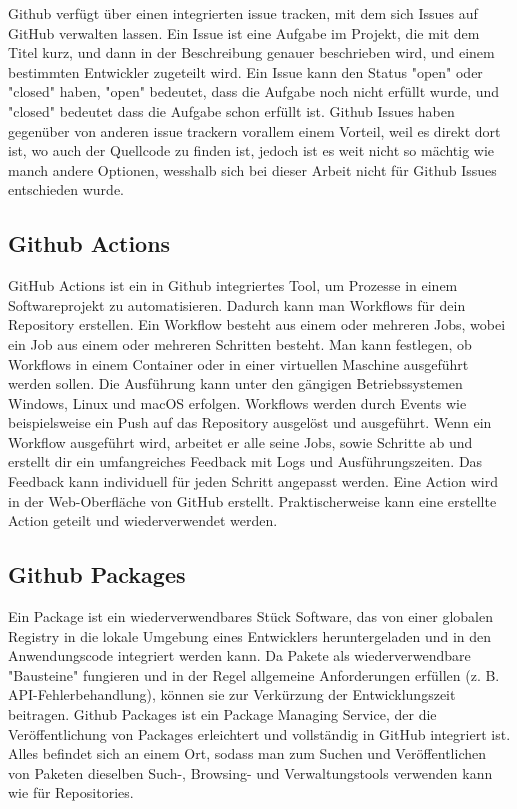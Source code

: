 Github verfügt über einen integrierten issue tracken, mit dem sich Issues auf GitHub verwalten lassen. Ein Issue ist eine 
Aufgabe im Projekt, die mit dem Titel kurz, und dann in der Beschreibung genauer beschrieben wird, und einem bestimmten Entwickler 
zugeteilt wird. Ein Issue kann den Status "open" oder "closed" haben, "open" bedeutet, dass die Aufgabe noch nicht erfüllt wurde, und 
"closed" bedeutet dass die Aufgabe schon erfüllt ist. Github Issues haben gegenüber von anderen issue trackern vorallem einem Vorteil, 
weil es direkt dort ist, wo auch der Quellcode zu finden ist, jedoch ist es weit nicht so mächtig wie manch andere Optionen, wesshalb 
sich bei dieser Arbeit nicht für Github Issues entschieden wurde.
\cite{sysarch-github-3}

\subsection{Github Actions}

GitHub Actions ist ein in Github integriertes Tool, um Prozesse in einem Softwareprojekt zu automatisieren. 
Dadurch kann man Workflows für dein Repository erstellen. Ein Workflow besteht aus einem oder mehreren Jobs, 
wobei ein Job aus einem oder mehreren Schritten besteht. Man kann festlegen, ob Workflows in einem Container oder in einer virtuellen 
Maschine ausgeführt werden sollen. Die Ausführung kann unter den gängigen Betriebssystemen Windows, Linux und macOS erfolgen. 
Workflows werden durch Events wie beispielsweise ein Push auf das Repository ausgelöst und ausgeführt. Wenn ein Workflow ausgeführt wird, 
arbeitet er alle seine Jobs, sowie Schritte ab und erstellt dir ein umfangreiches Feedback mit Logs und Ausführungszeiten. 
Das Feedback kann individuell für jeden Schritt angepasst werden. Eine Action wird in der Web-Oberfläche von GitHub erstellt. 
Praktischerweise kann eine erstellte Action geteilt und wiederverwendet werden.
\cite{sysarch-github-4}

\subsection{Github Packages}

Ein Package ist ein wiederverwendbares Stück Software, das von einer globalen Registry in die lokale Umgebung eines Entwicklers heruntergeladen und 
in den Anwendungscode integriert werden kann. Da Pakete als wiederverwendbare "Bausteine" fungieren und in der Regel allgemeine Anforderungen erfüllen 
(z. B. API-Fehlerbehandlung), können sie zur Verkürzung der Entwicklungszeit beitragen. Github Packages ist ein Package Managing Service, 
der die Veröffentlichung von Packages erleichtert und vollständig in GitHub integriert ist. Alles befindet sich an einem Ort, 
sodass man zum Suchen und Veröffentlichen von Paketen dieselben Such-, Browsing- und Verwaltungstools verwenden kann wie für Repositories.
\cite{sysarch-github-5}

